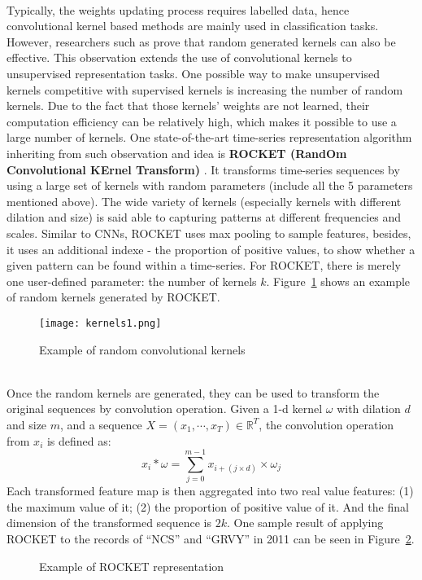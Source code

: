 \\Typically, the weights updating process requires labelled data, hence convolutional kernel based methods are mainly used in classification tasks. However, researchers such as \cite{saxe2011random,pinto2009high} prove that random generated kernels can also be effective. This observation extends the use of convolutional kernels to unsupervised representation tasks. One possible way to make unsupervised kernels competitive with supervised kernels is increasing the number of random kernels. Due to the fact that those kernels' weights are not learned, their computation efficiency can be relatively high, which makes it possible to use a large number of kernels. One state-of-the-art time-series representation algorithm inheriting from such observation and idea is \textbf{ROCKET (RandOm Convolutional KErnel Transform)} \cite{dempster2020rocket}. It transforms time-series sequences by using a large set of kernels with random parameters (include all the 5 parameters mentioned above). The wide variety of kernels (especially kernels with different dilation and size) is said able to capturing patterns at different frequencies and scales. Similar to CNNs, ROCKET uses max pooling to sample features, besides, it uses an additional indexe - the proportion of positive values, to show whether a given pattern can be found within a time-series. For ROCKET, there is merely one user-defined parameter: the number of kernels $k$. Figure~\ref{fig:kernels1} shows an example of random kernels generated by ROCKET. \\
\begin{figure}[!htbp]
    \centering
    \texttt{[image: kernels1.png]}
    \caption{Example of random convolutional kernels}
    \label{fig:kernels1}
\end{figure} 
\\Once the random kernels are generated, they can be used to transform the original sequences by convolution operation. Given a 1-d kernel $\omega$ with dilation $d$ and size $m$, and a sequence $X = (x_{1},\cdots, x_{T}) \in \mathbb{R}^{T} $, the convolution operation from $x_i$ is defined as:
\begin{equation}
    x_i * \omega = \sum_{j=0}^{m-1} x_{i+(j\times d)} \times \omega_j
\end{equation}
Each transformed feature map is then aggregated into two real value features: (1) the maximum value of it; (2) the proportion of positive value of it. And the final dimension of the transformed sequence is $2k$. One sample result of applying ROCKET to the records of ``NCS'' and ``GRVY'' in 2011 can be seen in Figure~\ref{fig:rocket1}. 
\begin{figure}[!htbp]
    \centering 
    \caption{Example of ROCKET representation} 
    \label{fig:rocket1} 
\end{figure} 

